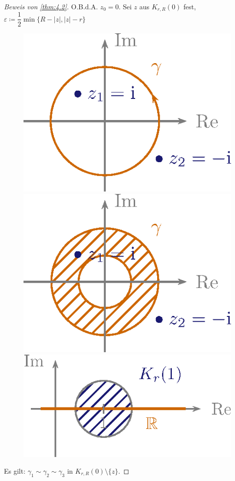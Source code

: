 \documentclass[a4paper,10pt]{scrbook}
\begin{document}
\begin{proof}[Beweis von \ref{thm:4.2}]
  O.B.d.A. $z_0 = 0$.
  Sei $z$ aus $K_{r,R}(0)$ fest, $\varepsilon \coloneq \dfrac{1}{2} \min \{ R - |z|, |z| - r\}$
  \begin{figure}[H]
    \centering
    \includegraphics[scale=0.2]{images/ana3-tmp-30}
    \hspace*{2em}
    \includegraphics[scale=0.2]{images/ana3-tmp-31}
    \hspace*{2em}
    \includegraphics[scale=0.2]{images/ana3-tmp-32}
  \end{figure}
  Es gilt: $\gamma_1 \sim \gamma_2 \sim \gamma_3$ in $K_{r,R}(0) \setminus \{z\}$.


\end{proof}
\end{document}
